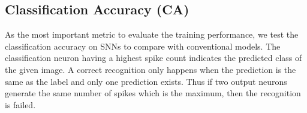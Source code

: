 \subsection{Classification Accuracy (CA)}
As the most important metric to evaluate the training performance, we test the classification accuracy on SNNs to compare with conventional models.
The classification neuron having a highest spike count indicates the predicted class of the given image.
A correct recognition only happens when the prediction is the same as the label and only one prediction exists.
Thus if two output neurons generate the same number of spikes which is the maximum, then the recognition is failed.

